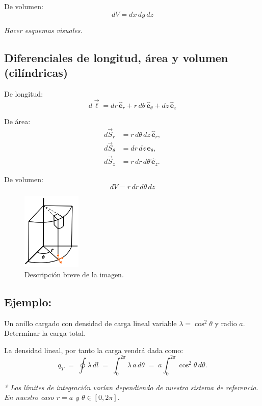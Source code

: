 \documentclass[a4paper,12pt]{article}
\begin{document}
De volumen:
\[
dV = dx\,dy\,dz
\]

\textit{Hacer esquemas visuales.}


\subsection{Diferenciales de longitud, área y volumen (cilíndricas)}

De longitud:
\[
d\vec{\ell} = dr\,\hat{\mathbf e}_r + r\,d\theta\,\hat{\mathbf e}_\theta + dz\,\hat{\mathbf e}_z
\]

De área:
\[
\begin{aligned}
d\vec{S}_r      &= r\,d\theta\,dz\,\hat{\mathbf e}_r,\\
d\vec{S}_\theta &= dr\,dz\,\hat{\mathbf e}_\theta,\\
d\vec{S}_z      &= r\,dr\,d\theta\,\hat{\mathbf e}_z.
\end{aligned}
\]

De volumen:
\[
dV = r\,dr\,d\theta\,dz
\]
\vspace{-2.0em}
\begin{figure}[h]
  \centering
  \includegraphics[width=0.25\textwidth]{imagen_7.jpeg}
  \caption{Descripción breve de la imagen.}
  \label{fig:imagen7}
\end{figure}


\subsection*{Ejemplo:}
\noindent
Un anillo cargado con densidad de carga lineal variable $\lambda=\cos^{2}\theta$ y radio $a$.
Determinar la carga total.

\medskip
\noindent
La densidad lineal, por tanto la carga vendrá dada como:
\[
q_T \;=\; \oint \lambda\, dl
 \;=\; \int_{0}^{2\pi} \lambda\, a\, d\theta
 \;=\; a \int_{0}^{2\pi} \cos^{2}\theta\, d\theta .
\]

\textit{* Los límites de integración varían dependiendo de nuestro sistema de referencia.  
En nuestro caso $r=a$ y $\theta\in[0,2\pi]$.}
\end{document}
